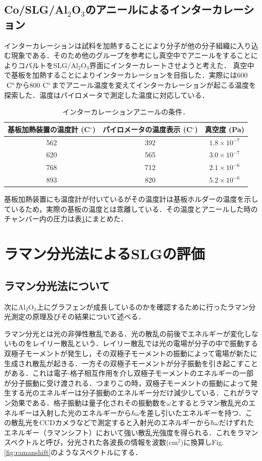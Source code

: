 \subsection{Co/SLG/Al$_{2}$O$_{3}$のアニールによるインターカレーション}
インターカレーションは試料を加熱することにより分子が他の分子組織に入り込む現象である．そのため他のグループを参考にし真空中でアニールをすることによりコバルトをSLG/Al$_{2}$O$_{3}$界面にインターカレートさせようと考えた．
真空中で基板を加熱することによりインターカレーションを目指した．実際には600$\rm\ C^{\circ}$から800$\rm\ C^{\circ}$までアニール温度を変えてインターカレーションが起こる温度を探索した．温度はパイロメータで測定した温度に対応している．
\begin{table}[htbp]
 \caption{インターカレーションアニールの条件．}
 \begin{center}
  \begin{tabular}{ccc}\toprule
  基板加熱装置の温度計 (C$^{\circ}$)	&	パイロメータの温度表示	(C$^{\circ}$)	&	真空度 (Pa)	\\	\hline 
	562		&	392 			&	$1.8\times10^{-7}$\\
	620   &   565      &  $3.0\times10^{-7}$  \\
	768  &	712			&	$2.1\times10^{-6}$	\\
	893  &   820  &    $5.2\times10^{-6}$     
						\\	\bottomrule
  \end{tabular}
 \end{center}
 \label{tb:ICcond}
\end{table}

基板加熱装置にも温度計が付いているがその温度計は基板ホルダーの温度を示しているため，実際の基板の温度とは乖離している．その温度とアニールした時のチャンバー内の圧力は表\ref{tb:ICcond}にまとめた．

\section{ラマン分光法によるSLGの評価}
\subsection{ラマン分光法について}
次にAl$_{2}$O$_{3}$上にグラフェンが成長しているのかを確認するために行ったラマン分光測定の原理及びその結果について述べる．

ラマン分光とは光の非弾性散乱である．光の散乱の前後でエネルギーが変化しないものをレイリー散乱という．レイリー散乱では光の電場が分子の中で振動する双極子モーメントが発生し，その双極子モーメントの振動によって電場が新たに生成され散乱が起きる．一方その双極子モーメントが分子振動を引き起こすことがある．これは電子-格子相互作用を介し双極子モーメントのエネルギーの一部が分子振動に受け渡される．つまりこの時，双極子モーメントの振動によって発生する光のエネルギーは分子振動のエネルギー分だけ減少している．これがラマン効果である．格子振動は量子化されその振動数を$\omega$とするとラマン散乱光のエネルギーは入射した光のエネルギーから$\hbar\omega$を差し引いたエネルギーを持つ．この散乱光をCCDカメラなどで測定すると入射光のエネルギーから$\hbar\omega$だけずれたエネルギー（ラマンシフト）において強い散乱光強度を得られる．これをラマンスペクトルと呼び，分光された各波長の情報を波数(cm$^{2}$)に換算しFig.\ref{fig:ramanshift}のようなスペクトルにする．

